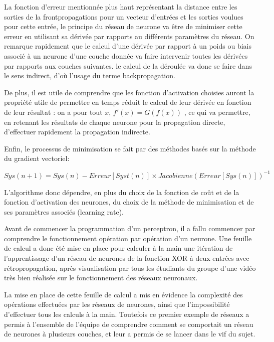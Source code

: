 \documentclass[
    10pt,
    a4paper,
    oneside,
    headinclude,footinclude,
    BCOR=5mm,
    captions=tableabove
]{scrartcl}
\begin{document}
 La fonction d'erreur mentionnée plus haut représentant la distance entre les sorties de la frontpropagations pour un vecteur d'entrées et les sorties voulues pour cette entrée, le principe du réseau de neurone va être de minimiser cette erreur en utilisant sa dérivée par rapports au différents paramètres du réseau. On remarque rapidement que le calcul d'une dérivée par rapport à un poids ou biais associé à un neurone d'une couche donnée va faire intervenir toutes les dérivées par rapports aux couches suivantes. le calcul de la déroulée va donc se faire dans le sens indirect, d'où l'usage du terme backpropagation.

De plus, il est utile de comprendre que les fonction d'activation choisies auront la propriété utile de permettre en temps réduit le calcul de leur dérivée en fonction de leur résultat : on a pour tout $x$, $f'(x)=G(f(x))$ , ce qui va permettre, en retenant les résultats de chaque neurone pour la propagation directe, d'effectuer rapidement la propagation indirecte. 

Enfin, le processus de minimisation se fait par des méthodes basés sur la méthode du gradient vectoriel:

 \hspace{4mm} $Sys(n+1) = Sys(n) - Erreur[Syst(n)] \times Jacobienne(Erreur[Sys(n)]) ^{-1} $   

L'algorithme donc dépendre, en plus du choix de la fonction de coût et de la fonction d'activation des neurones, du choix de la méthode de minimisation et de ses paramètres associés (learning rate).
\vspace{5mm}

Avant de commencer la programmation d'un perceptron, il a fallu commencer par comprendre le fonctionnement opération par opération d'un neurone. Une feuille de calcul a donc été mise en place pour calculer à la main une itération de l'apprentissage d'un réseau de neurones de la fonction XOR à deux entrées avec rétropropagation, après visualisation par tous les étudiants du groupe d'une vidéo très bien réalisée sur le fonctionnement des réseaux neuronaux.

La mise en place de cette feuille de calcul a mis en évidence la complexité des opérations effectuées par les réseaux de neurones, ainsi que l'impossibilité d'effectuer tous les calculs à la main. Toutefois ce premier exemple de réseaux a permis à l'ensemble de l'équipe de comprendre comment se comportait un réseau de neurones à plusieurs couches, et leur a permis de se lancer dans le vif du sujet. 
\vspace{30mm}
\end{document}
